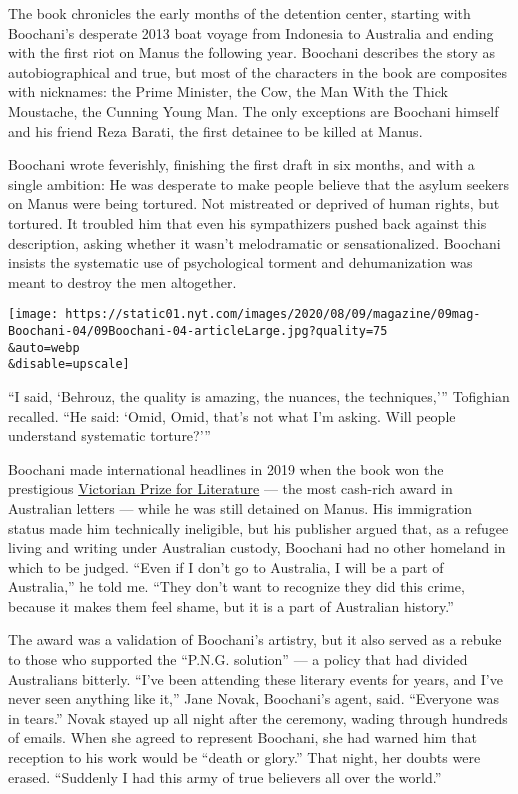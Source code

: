 The book chronicles the early months of the detention center, starting
with Boochani's desperate 2013 boat voyage from Indonesia to Australia
and ending with the first riot on Manus the following year. Boochani
describes the story as autobiographical and true, but most of the
characters in the book are composites with nicknames: the Prime
Minister, the Cow, the Man With the Thick Moustache, the Cunning Young
Man. The only exceptions are Boochani himself and his friend Reza
Barati, the first detainee to be killed at Manus.

Boochani wrote feverishly, finishing the first draft in six months, and
with a single ambition: He was desperate to make people believe that the
asylum seekers on Manus were being tortured. Not mistreated or deprived
of human rights, but tortured. It troubled him that even his
sympathizers pushed back against this description, asking whether it
wasn't melodramatic or sensationalized. Boochani insists the systematic
use of psychological torment and dehumanization was meant to destroy the
men altogether.

\texttt{[image: https://static01.nyt.com/images/2020/08/09/magazine/09mag-Boochani-04/09Boochani-04-articleLarge.jpg?quality=75\\\&auto=webp\\\&disable=upscale]}

``I said, `Behrouz, the quality is amazing, the nuances, the
techniques,''' Tofighian recalled. ``He said: `Omid, Omid, that's not
what I'm asking. Will people understand systematic torture?'''

Boochani made international headlines in 2019 when the book won the
prestigious
\href{https://www.nytimes.com/2019/01/31/world/australia/behrouz-boochani-victorian-prize-manus-island.html}{Victorian
Prize for Literature} --- the most cash-rich award in Australian letters
--- while he was still detained on Manus. His immigration status made
him technically ineligible, but his publisher argued that, as a refugee
living and writing under Australian custody, Boochani had no other
homeland in which to be judged. ``Even if I don't go to Australia, I
will be a part of Australia,'' he told me. ``They don't want to
recognize they did this crime, because it makes them feel shame, but it
is a part of Australian history.''

The award was a validation of Boochani's artistry, but it also served as
a rebuke to those who supported the ``P.N.G. solution'' --- a policy
that had divided Australians bitterly. ``I've been attending these
literary events for years, and I've never seen anything like it,'' Jane
Novak, Boochani's agent, said. ``Everyone was in tears.'' Novak stayed
up all night after the ceremony, wading through hundreds of emails. When
she agreed to represent Boochani, she had warned him that reception to
his work would be ``death or glory.'' That night, her doubts were
erased. ``Suddenly I had this army of true believers all over the
world.''

